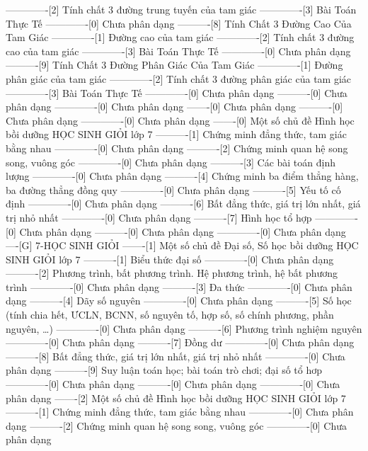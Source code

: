 -------------[2] Tính chất 3 đường trung tuyến của tam giác
-------------[3] Bài Toán Thực Tế
-------------[0] Chưa phân dạng
----------[8] Tính Chất 3 Đường Cao Của Tam Giác
-------------[1] Đường cao của tam giác
-------------[2] Tính chất 3 đường cao của tam giác
-------------[3] Bài Toán Thực Tế
-------------[0] Chưa phân dạng
----------[9] Tính Chất 3 Đường Phân Giác Của Tam Giác
-------------[1] Đường phân giác của tam giác
-------------[2] Tính chất 3 đường phân giác của tam giác
-------------[3] Bài Toán Thực Tế
-------------[0] Chưa phân dạng
----------[0] Chưa phân dạng
-------------[0] Chưa phân dạng
-------[0] Chưa phân dạng
----------[0] Chưa phân dạng
-------------[0] Chưa phân dạng
-------[0] Một số chủ đề Hình học bồi dưỡng HỌC SINH GIỎI lớp 7
----------[1] Chứng minh đẳng thức, tam giác bằng nhau
-------------[0] Chưa phân dạng
----------[2] Chứng minh quan hệ song song, vuông góc
-------------[0] Chưa phân dạng
----------[3] Các bài toán định lượng
-------------[0] Chưa phân dạng
----------[4] Chứng minh ba điểm thẳng hàng, ba đường thẳng đồng quy
-------------[0] Chưa phân dạng
----------[5] Yếu tố cố định
-------------[0] Chưa phân dạng
----------[6] Bất đẳng thức, giá trị lớn nhất, giá trị nhỏ nhất
-------------[0] Chưa phân dạng
----------[7] Hình học tổ hợp
-------------[0] Chưa phân dạng
----------[0] Chưa phân dạng
-------------[0] Chưa phân dạng
----[G] 7-HỌC SINH GIỎI
-------[1] Một số chủ đề Đại số, Số học bồi dưỡng HỌC SINH GIỎI lớp 7
----------[1] Biểu thức đại số
-------------[0] Chưa phân dạng
----------[2] Phương trình, bất phương trình. Hệ phương trình, hệ bất phương trình
-------------[0] Chưa phân dạng
----------[3] Đa thức
-------------[0] Chưa phân dạng
----------[4] Dãy số nguyên
-------------[0] Chưa phân dạng
----------[5] Số học (tính chia hết, ƯCLN, BCNN, số nguyên tố, hợp số, số chính phương, phần nguyên, \ldots)
-------------[0] Chưa phân dạng
----------[6] Phương trình nghiệm nguyên
-------------[0] Chưa phân dạng
----------[7] Đồng dư
-------------[0] Chưa phân dạng
----------[8] Bất đẳng thức, giá trị lớn nhất, giá trị nhỏ nhất
-------------[0] Chưa phân dạng
----------[9] Suy luận toán học; bài toán trò chơi; đại số tổ hơp
-------------[0] Chưa phân dạng
----------[0] Chưa phân dạng
-------------[0] Chưa phân dạng
-------[2] Một số chủ đề Hình học bồi dưỡng HỌC SINH GIỎI lớp 7
----------[1] Chứng minh đẳng thức, tam giác bằng nhau
-------------[0] Chưa phân dạng
----------[2] Chứng minh quan hệ song song, vuông góc
-------------[0] Chưa phân dạng
